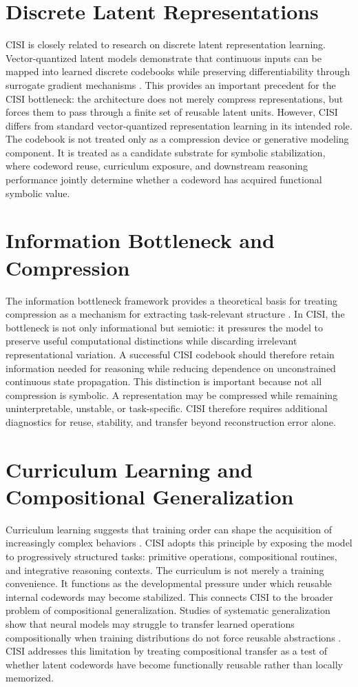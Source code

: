 \section{Discrete Latent Representations}
CISI is closely related to research on discrete latent representation learning. Vector-quantized latent models demonstrate that continuous inputs can be mapped into learned discrete codebooks while preserving differentiability through surrogate gradient mechanisms \cite{VanDenOord2017}. This provides an important precedent for the CISI bottleneck: the architecture does not merely compress representations, but forces them to pass through a finite set of reusable latent units.
However, CISI differs from standard vector-quantized representation learning in its intended role. The codebook is not treated only as a compression device or generative modeling component. It is treated as a candidate substrate for symbolic stabilization, where codeword reuse, curriculum exposure, and downstream reasoning performance jointly determine whether a codeword has acquired functional symbolic value.
\section{Information Bottleneck and Compression}
The information bottleneck framework provides a theoretical basis for treating compression as a mechanism for extracting task-relevant structure \cite{Tishby2000}. In CISI, the bottleneck is not only informational but semiotic: it pressures the model to preserve useful computational distinctions while discarding irrelevant representational variation. A successful CISI codebook should therefore retain information needed for reasoning while reducing dependence on unconstrained continuous state propagation.
This distinction is important because not all compression is symbolic. A representation may be compressed while remaining uninterpretable, unstable, or task-specific. CISI therefore requires additional diagnostics for reuse, stability, and transfer beyond reconstruction error alone.
\section{Curriculum Learning and Compositional Generalization}
Curriculum learning suggests that training order can shape the acquisition of increasingly complex behaviors \cite{Bengio2009}. CISI adopts this principle by exposing the model to progressively structured tasks: primitive operations, compositional routines, and integrative reasoning contexts. The curriculum is not merely a training convenience. It functions as the developmental pressure under which reusable internal codewords may become stabilized.
This connects CISI to the broader problem of compositional generalization. Studies of systematic generalization show that neural models may struggle to transfer learned operations compositionally when training distributions do not force reusable abstractions \cite{Lake2018}. CISI addresses this limitation by treating compositional transfer as a test of whether latent codewords have become functionally reusable rather than locally memorized.
